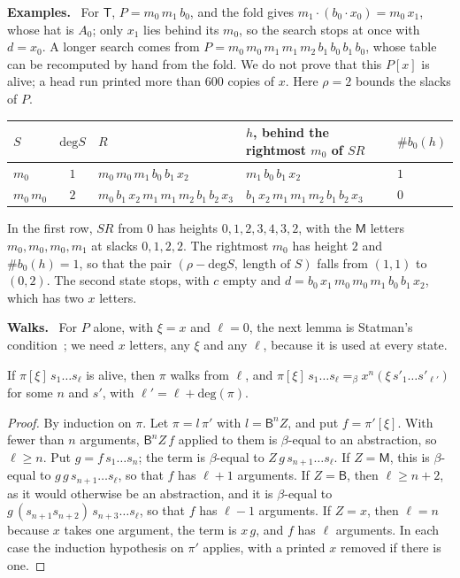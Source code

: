 \documentclass[a4paper,english]{lipics-v2021}
\newcommand{\B}{\mathsf{B}}
\newcommand{\M}{\mathsf{M}}
\newcommand{\T}{\mathsf{T}}
\newcommand{\eqb}{=_{\beta}}
\newcommand{\dg}{\mathrm{deg}}
\newcommand{\nb}[1]{\#b_0(#1)}
\newcommand{\runin}[1]{\par\smallskip\noindent\textbf{#1}\ }
\begin{document}
\runin{Examples.} For $\T$, $P = m_0\,m_1\,b_0$, and the fold gives $m_1\cdot(b_0\cdot x_0) = m_0\,x_1$, whose hat is $A_0$; only $x_1$ lies behind its $m_0$, so the search stops at once with $d = x_0$. A longer search comes from $P = m_0\,m_0\,m_1\,m_1\,m_2\,b_1\,b_0\,b_1\,b_0$, whose table can be recomputed by hand from the fold. We do not prove that this $P[x]$ is alive; a head run printed more than $600$ copies of $x$. Here $\rho = 2$ bounds the slacks of $P$.
\begin{center}
\small
\begin{tabular}{@{}lclll@{}}
\toprule
$S$ & $\dg S$ & $R$ & $h$, behind the rightmost $m_0$ of $SR$ & $\nb{h}$\\
\midrule
$m_0$ & $1$ & $m_0\,m_0\,m_1\,b_0\,b_1\,x_2$ & $m_1\,b_0\,b_1\,x_2$ & $1$\\
$m_0\,m_0$ & $2$ & $m_0\,b_1\,x_2\,m_1\,m_1\,m_2\,b_1\,b_2\,x_3$ & $b_1\,x_2\,m_1\,m_1\,m_2\,b_1\,b_2\,x_3$ & $0$\\
\bottomrule
\end{tabular}
\end{center}
In the first row, $SR$ from $0$ has heights $0,1,2,3,4,3,2$, with the $\M$ letters $m_0,m_0,m_0,m_1$ at slacks $0,1,2,2$. The rightmost $m_0$ has height $2$ and $\nb{h} = 1$, so that the pair $(\rho - \dg S,\ \text{length of }S)$ falls from $(1,1)$ to $(0,2)$. The second state stops, with $c$ empty and $d = b_0\,x_1\,m_0\,m_0\,m_1\,b_0\,b_1\,x_2$, which has two $x$ letters.

\runin{Walks.} For $P$ alone, with $\xi = x$ and $\ell = 0$, the next lemma is Statman's condition~\cite[Lemma~6.2.3, Corollary~6.2.2]{statman2017}; we need $x$ letters, any $\xi$ and any $\ell$, because it is used at every state.

\begin{lemma}\label{lem:list}
If $\pi[\xi]\,s_1\ldots s_\ell$ is alive, then $\pi$ walks from $\ell$, and $\pi[\xi]\,s_1\ldots s_\ell \eqb x^n(\xi\,s'_1\ldots s'_{\ell'})$ for some $n$ and $s'$, with $\ell' = \ell + \dg(\pi)$.
\end{lemma}

\begin{proof}
By induction on $\pi$. Let $\pi = l\,\pi'$ with $l = \B^nZ$, and put $f = \pi'[\xi]$. With fewer than $n$ arguments, $\B^nZ\,f$ applied to them is $\beta$-equal to an abstraction, so $\ell \geq n$. Put $g = f\,s_1\ldots s_n$; the term is $\beta$-equal to $Z\,g\,s_{n+1}\ldots s_\ell$. If $Z = \M$, this is $\beta$-equal to $g\,g\,s_{n+1}\ldots s_\ell$, so that $f$ has $\ell+1$ arguments. If $Z = \B$, then $\ell \geq n+2$, as it would otherwise be an abstraction, and it is $\beta$-equal to $g\,(s_{n+1}s_{n+2})\,s_{n+3}\ldots s_\ell$, so that $f$ has $\ell - 1$ arguments. If $Z = x$, then $\ell = n$ because $x$ takes one argument, the term is $x\,g$, and $f$ has $\ell$ arguments. In each case the induction hypothesis on $\pi'$ applies, with a printed $x$ removed if there is one.
\end{proof}
\end{document}
